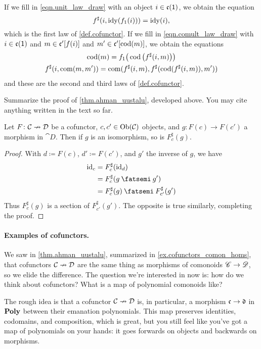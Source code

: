 \documentclass[Book-Poly]{subfiles}
\begin{document}
If we fill in \cref{eqn.unit_law_draw} with an object $i\in\mathfrak{c}(\textsf{1})$, we obtain the equation
\[f^\sharp(i,\operatorname{idy}(f_1(i)))=\operatorname{idy}(i),\]
which is the first law of \cref{def.cofunctor}. If we fill in \cref{eqn.comult_law_draw} with $i\in\mathfrak{c}(\textsf{1})$ and $m\in\mathfrak{c}'[f(i)]$ and $m'\in\mathfrak{c}'[\operatorname{cod}(m)]$, we obtain the equations
\begin{gather*}
  \operatorname{cod}(m)=f_1\big(\operatorname{cod}\big(f^\sharp(i,m)\big)\big)\\
  f^\sharp(i,\operatorname{com}(m,m'))=\operatorname{com}(f^\sharp(i,m),f^\sharp(\operatorname{cod}(f^\sharp(i,m)),m'))
\end{gather*}
and these are the second and third laws of \cref{def.cofunctor}.

\begin{exercise}\label{ex.cofunctors_comon_homs}
Summarize the proof of \cref{thm.ahman_uustalu}, developed above. You may cite anything written in the text so far.
\end{exercise}

\begin{proposition}\label{prop.cofunctors_isos}
Let $F\colon\mathcal{C}\nrightarrow\mathcal{D}$ be a cofunctor, $c,c'\in\operatorname{Ob}(\mathcal{C})$ objects, and $g\colon F(c)\to F(c')$ a morphism in $\cat{D}$. Then if $g$ is an isomorphism, so is $F^\sharp_{c}(g)$.
\end{proposition}
\begin{proof}
With $d\coloneqq F(c)$, $d'\coloneqq F(c')$, and $g'$ the inverse of $g$, we have
\begin{align*}
	\id_c&=
	F^\sharp_c(\id_d)\\&=
	F^\sharp_c(g\then g')\\&=
	F^\sharp_c(g)\then F^\sharp_{c'}(g')
\end{align*}
Thus $F^\sharp_{c}(g)$ is a section of $F^\sharp_{c'}(g')$. The opposite is true similarly, completing the proof.
\end{proof}


\paragraph{Examples of cofunctors.}

We saw in \cref{thm.ahman_uustalu}, summarized in \cref{ex.cofunctors_comon_homs}, that cofunctors $\mathcal{C}\nrightarrow\mathcal{D}$ are the same thing as morphisms of comonoids $\mathscr{C}\to\mathscr{D}$, so we elide the difference. The question we're interested in now is: how do we think about cofunctors? What is a map of polynomial comonoids like?

The rough idea is that a cofunctor $\mathcal{C}\nrightarrow\mathcal{D}$ is, in particular, a morphism $\mathfrak{c}\to\mathfrak{d}$ in $\mathbf{Poly}$ between their emanation polynomials. This map preserves identities, codomains, and composition, which is great, but you still feel like you've got a map of polynomials on your hands: it goes forwards on objects and backwards on morphisms.
\end{document}
